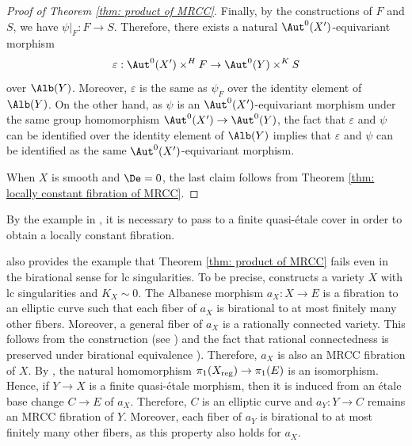 \documentclass[11pt]{amsart}
\begin{document}
\begin{proof}[Proof of Theorem \ref{thm: product of MRCC}]
        
        Finally, by the constructions of $F$ and $S$, we have $\psi|_F: F \to S$. Therefore, there exists a natural $\Aut^0(X')$-equivariant morphism
        \[
        \varepsilon: \Aut^0(X') \times^H F \to \Aut^0(Y) \times^K S
        \] over $\Alb(Y)$. Moreover, $\varepsilon$ is the same as $\psi_F$ over the identity element of $\Alb(Y)$. On the other hand, as $\psi$ is an $\Aut^0(X')$-equivariant morphism under the same group homomorphism $\Aut^0(X') \to \Aut^0(Y)$, the fact that $\varepsilon$ and $\psi$ can be identified over the identity element of $\Alb(Y)$ implies that $\varepsilon$ and $\psi$ can be identified as the same $\Aut^0(X')$-equivariant morphism.

        When $X$ is smooth and $\De=0$, the last claim follows from Theorem \ref{thm: locally constant fibration of MRCC}.
    \end{proof}

\begin{remark}
    By the example in \cite[Remark 4.10]{MW23}, it is necessary to pass to a finite quasi-\'etale cover in order to obtain a locally constant fibration. 
    \end{remark}

    \begin{remark}
    \cite[Theorem 1.1]{BFPT24} also provides the example that Theorem \ref{thm: product of MRCC} fails even in the birational sense for lc singularities. To be precise, \cite[Theorem 1.1]{BFPT24} constructs a variety $X$ with lc singularities and $K_X \sim 0$. The Albanese morphism $a_X: X \to E$ is a fibration to an elliptic curve such that each fiber of $a_X$ is birational to at most finitely many other fibers. Moreover, a general fiber of $a_X$ is a rationally connected variety. This follows from the construction (see \cite[\S 4.2]{BFPT24}) and the fact that rational connectedness is preserved under birational equivalence \cite[(IV. (3.3.3))]{Kol96}). Therefore, $a_X$ is also an MRCC fibration of $X$. By \cite[Theorem 1.1 (3)]{BFPT24} , the natural homomorphism $\pi_1(X_{\rm reg}) \to \pi_1(E)$ is an isomorphism. Hence, if $Y \to X$ is a finite quasi-\'etale morphism, then it is induced from an \'etale base change $C \to E$ of $a_X$. Therefore, $C$ is an elliptic curve and $a_Y: Y \to C$ remains an MRCC fibration of $Y$. Moreover, each fiber of $a_Y$ is birational to at most finitely many other fibers, as this property also holds for $a_X$.
\end{remark}
\end{document}
